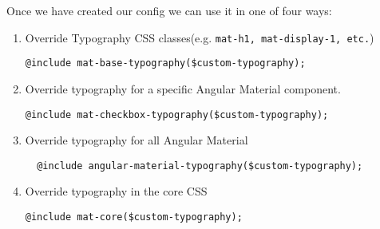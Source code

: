 Once we have created our config we can use it in one of four ways: 
\begin{enumerate}
\item Override Typography CSS classes(e.g. \lstinline{mat-h1, mat-display-1, etc.})
\begin{lstlisting}
@include mat-base-typography($custom-typography);
\end{lstlisting}

\item Override typography for a specific Angular Material component.
\begin{lstlisting}
@include mat-checkbox-typography($custom-typography);
\end{lstlisting}

\item Override typography for all Angular Material
\begin{lstlisting}
  @include angular-material-typography($custom-typography);
\end{lstlisting}

\item Override typography in the core CSS
\begin{lstlisting}
@include mat-core($custom-typography);
\end{lstlisting} 
\end{enumerate}



